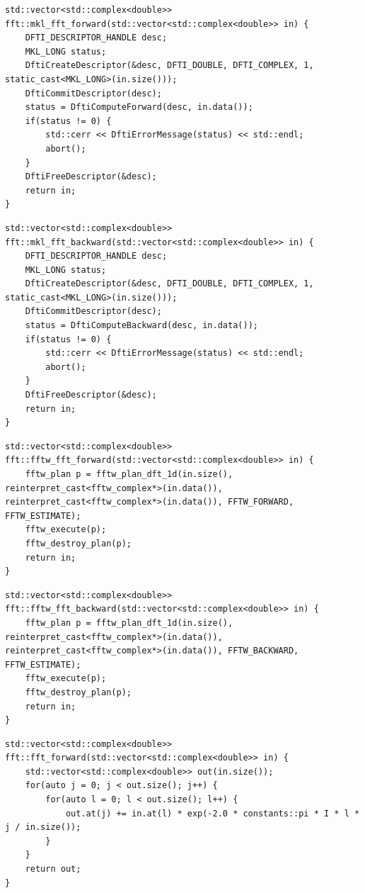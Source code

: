 \begin{lstlisting}[style=CXX, caption=Function performing forward fast Fourier transform using MKL library]
std::vector<std::complex<double>> fft::mkl_fft_forward(std::vector<std::complex<double>> in) {
	DFTI_DESCRIPTOR_HANDLE desc;
	MKL_LONG status;
	DftiCreateDescriptor(&desc, DFTI_DOUBLE, DFTI_COMPLEX, 1, static_cast<MKL_LONG>(in.size()));
	DftiCommitDescriptor(desc);
	status = DftiComputeForward(desc, in.data());
	if(status != 0) {
		std::cerr << DftiErrorMessage(status) << std::endl;
		abort();
	}
	DftiFreeDescriptor(&desc);
	return in;
}
\end{lstlisting}

\begin{lstlisting}[style=CXX, caption=Function performing backward fast Fourier transform using MKL library]
std::vector<std::complex<double>> fft::mkl_fft_backward(std::vector<std::complex<double>> in) {
	DFTI_DESCRIPTOR_HANDLE desc;
	MKL_LONG status;
	DftiCreateDescriptor(&desc, DFTI_DOUBLE, DFTI_COMPLEX, 1, static_cast<MKL_LONG>(in.size()));
	DftiCommitDescriptor(desc);
	status = DftiComputeBackward(desc, in.data());
	if(status != 0) {
		std::cerr << DftiErrorMessage(status) << std::endl;
		abort();
	}
	DftiFreeDescriptor(&desc);
	return in;
}
\end{lstlisting}

\begin{lstlisting}[style=CXX, caption=Function performing forward fast Fourier transform using FFTW library]
std::vector<std::complex<double>> fft::fftw_fft_forward(std::vector<std::complex<double>> in) {
	fftw_plan p = fftw_plan_dft_1d(in.size(), reinterpret_cast<fftw_complex*>(in.data()), reinterpret_cast<fftw_complex*>(in.data()), FFTW_FORWARD, FFTW_ESTIMATE);
	fftw_execute(p);
	fftw_destroy_plan(p);
	return in;
}
\end{lstlisting}

\begin{lstlisting}[style=CXX, caption=Function performing backward fast Fourier transform using FFTW library]
std::vector<std::complex<double>> fft::fftw_fft_backward(std::vector<std::complex<double>> in) {
	fftw_plan p = fftw_plan_dft_1d(in.size(), reinterpret_cast<fftw_complex*>(in.data()), reinterpret_cast<fftw_complex*>(in.data()), FFTW_BACKWARD, FFTW_ESTIMATE);
	fftw_execute(p);
	fftw_destroy_plan(p);
	return in;
}
\end{lstlisting}

\begin{lstlisting}[style=CXX, caption=Function performing forward discrete Fourier transform without using any library]
std::vector<std::complex<double>> fft::fft_forward(std::vector<std::complex<double>> in) {
	std::vector<std::complex<double>> out(in.size());
	for(auto j = 0; j < out.size(); j++) {
		for(auto l = 0; l < out.size(); l++) {
			out.at(j) += in.at(l) * exp(-2.0 * constants::pi * I * l * j / in.size());
		}
	}
	return out;
}
\end{lstlisting}

